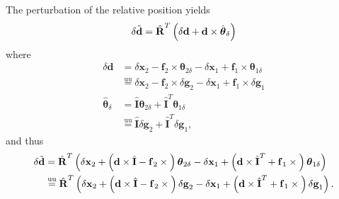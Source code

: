 \documentclass[10pt,dvips,fleqn,subeqn]{report}
\newcommand{\T}[1]{\bm{\mathbf{#1}}}
\newcommand{\TT}[1]{\bm{\mathbf{#1}}}
\newcommand{\equu}{\overset{\text{uu}}{=}}
\begin{document}
The perturbation of the relative position yields
\begin{equation}
	\delta\tilde{\T{d}} = \hat{\TT{R}}^T \plbr{
		\delta\T{d} + \T{d} \times \hat{\T{\theta}}_{\delta}
	}
\end{equation}
where
\begin{subequations}
\begin{align}
	\delta\T{d}
	&= \delta\T{x}_2 - \T{f}_2 \times \T{\theta}_{2\delta}
		- \delta\T{x}_1 + \T{f}_1 \times \T{\theta}_{1\delta}
		\nonumber \\
	&\equu \delta\T{x}_2 - \T{f}_2 \times \delta\T{g}_2
		- \delta\T{x}_1 + \T{f}_1 \times \delta\T{g}_1
	\\
	\hat{\T{\theta}}_{\delta}
	&= \hat{\TT{I}} \T{\theta}_{2\delta} + \hat{\TT{I}}^T \T{\theta}_{1\delta}
		\nonumber \\
	&\equu \hat{\TT{I}} \delta\T{g}_2 + \hat{\TT{I}}^T \delta\T{g}_1 ,
\end{align}
\end{subequations}
and thus
\begin{align}
	\delta\tilde{\T{d}} 
	&= \hat{\TT{R}}^T \plbr{
		\delta\T{x}_2
		+ \plbr{
			\T{d}\times\hat{\TT{I}}
			- \T{f}_2 \times{}
		} \T{\theta}_{2\delta}
		- \delta\T{x}_1
		+ \plbr{
			\T{d}\times\hat{\TT{I}}^T
			+ \T{f}_1 \times{}
		} \T{\theta}_{1\delta}
	}
	\nonumber \\
	&\equu \hat{\TT{R}}^T \plbr{
		\delta\T{x}_2
		+ \plbr{
			\T{d}\times\hat{\TT{I}}
			- \T{f}_2 \times{}
		} \delta\T{g}_2
		- \delta\T{x}_1
		+ \plbr{
			\T{d}\times\hat{\TT{I}}^T
			+ \T{f}_1 \times{}
		} \delta\T{g}_1
	}
	.
\end{align}
\end{document}
